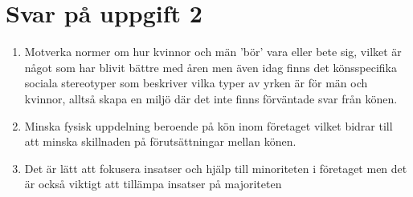 \documentclass[a4paper,12pt]{article}
\begin{document}
\section*{Svar på uppgift 2}
\begin{enumerate}
    \item Motverka normer om hur kvinnor och män 'bör' vara eller bete sig,
    vilket är något som har blivit bättre med åren men även idag finns det
    könsspecifika sociala stereotyper som beskriver vilka typer av yrken är
    för män och kvinnor, alltså skapa en miljö där det inte finns
    förväntade svar från könen.
    \item Minska fysisk uppdelning beroende på kön inom företaget vilket bidrar
    till att minska skillnaden på förutsättningar mellan könen.
    \item Det är lätt att fokusera insatser och hjälp till minoriteten i
    företaget men det är också viktigt att tillämpa insatser på majoriteten
\end{enumerate}
%
\end{document}
